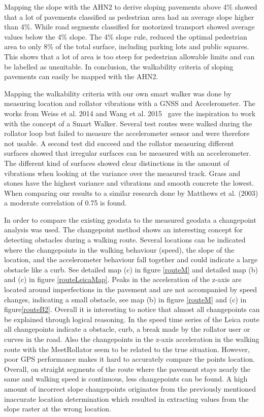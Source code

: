 Mapping the slope with the AHN2 to derive sloping pavements above 4\% showed that a lot of pavements classified as pedestrian area had an average slope higher than 4\%. While road segments classified for motorized transport showed average values below the 4\% slope. The 4\% slope rule, reduced the optimal pedestrian area to only 8\% of the total surface, including parking lots and public squares. This shows that a lot of area is too steep for pedestrian allowable limits and can be labelled as unsuitable. In conclusion, the walkability criteria of sloping pavements can easily be mapped with the AHN2.

Mapping the walkability criteria with our own smart walker was done by measuring location and rollator vibrations with a GNSS and Accelerometer. The works from Weiss et al. 2014 and Wang et al. 2015~\cite{Weiss2014, Wang2015} gave the inspiration to work with the concept of a Smart Walker. Several test routes were walked during the rollator loop but failed to measure the accelerometer sensor and were therefore not usable. A second test did succeed and the rollator measuring different surfaces showed that irregular surfaces can be measured with an accelerometer. The different kind of surfaces showed clear distinctions in the amount of vibrations when looking at the variance over the measured track. Grass and stones have the highest variance and vibrations and smooth concrete the lowest. When comparing our results to a similar research done by Matthews et al. (2003) a moderate correlation of 0.75 is found.

In order to compare the existing geodata to the measured geodata a changepoint analysis was used. The changepoint method shows an interesting concept for detecting obstacles during a walking route. Several locations can be indicated where the changepoints in the walking behaviour (speed), the slope of the location, and the accelerometer behaviour fall together and could indicate a large obstacle like a curb. See detailed map (c) in figure \ref{routeM} and detailed map (b) and (c) in figure \ref{routeLeicaMap}. Peaks in the acceleration of the z-axis are located around imperfections in the pavement and are not accompanied by speed changes, indicating a small obstacle, see map (b) in figure \ref{routeM} and (c) in figure\ref{routeB2}. Overall it is interesting to notice that almost all changepoints can be explained through logical reasoning. In the speed time series of the Leica route all changepoints indicate a obstacle, curb, a break made by the rollator user or curves in the road. Also the changepoints in the z-axis acceleration in the walking route with the MeetRollator seem to be related to the true situation. However, poor GPS performance makes it hard to accurately compare the points location. Overall, on straight segments of the route where the pavement stays nearly the same and walking speed is continuous, less changepoints can be found. A high amount of incorrect slope changepoints originates from the previously mentioned inaccurate location determination which resulted in extracting values from the slope raster at the wrong location. 

